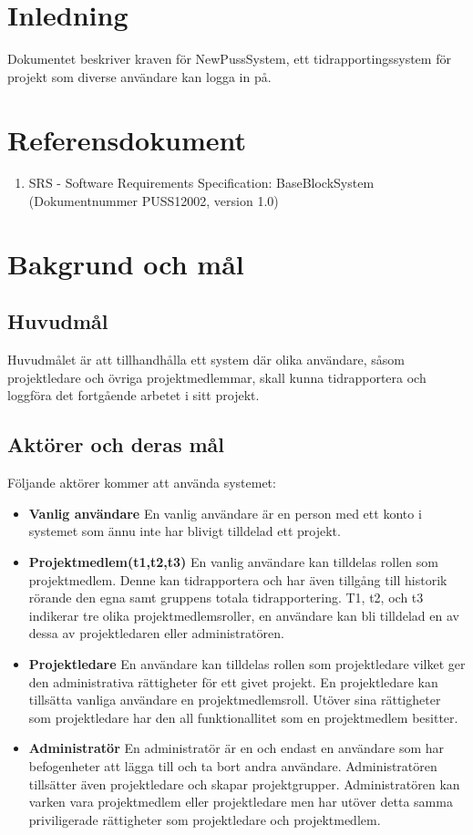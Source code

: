 \documentclass[a4paper]{article}
\begin{document}
\section{Inledning}       
Dokumentet beskriver kraven för NewPussSystem, ett tidrapportingssystem för projekt som diverse användare kan logga in på.

\section{Referensdokument}
\begin{enumerate}
\item SRS - Software Requirements Specification: BaseBlockSystem (Dokumentnummer PUSS12002, version 1.0)
\end{enumerate}
\section{Bakgrund och mål}   
\subsection{Huvudmål}
Huvudmålet är att tillhandhålla ett system där olika användare, såsom projektledare och övriga projektmedlemmar, skall kunna tidrapportera och loggföra det fortgående arbetet i sitt projekt. 

\subsection{Aktörer och deras mål}
\label{bom-aktorer}
Följande aktörer kommer att använda systemet:
\begin{itemize}
\item [] \textbf{Vanlig användare} En vanlig användare är en person med ett konto i systemet som ännu inte har blivigt tilldelad ett projekt.
\item [] \textbf{Projektmedlem(t1,t2,t3)} En vanlig användare kan tilldelas rollen som projektmedlem. Denne kan tidrapportera och har även tillgång till historik rörande den egna samt gruppens totala tidrapportering. T1, t2, och t3 indikerar tre olika projektmedlemsroller, en användare kan bli tilldelad en av dessa av projektledaren eller administratören.
\item [] \textbf{Projektledare} En användare kan tilldelas rollen som projektledare vilket ger den administrativa rättigheter för ett givet projekt. En projektledare kan tillsätta vanliga användare en projektmedlemsroll. Utöver sina rättigheter som projektledare har den all funktionallitet som en projektmedlem besitter.
\item [] \textbf{Administratör} En administratör är en och endast en användare som har befogenheter att lägga till och ta bort andra användare. Administratören tillsätter även projektledare och skapar projektgrupper. Administratören kan varken vara projektmedlem eller projektledare men har utöver detta samma priviligerade rättigheter som projektledare och projektmedlem.
\end{itemize}
\newpage
\end{document}
